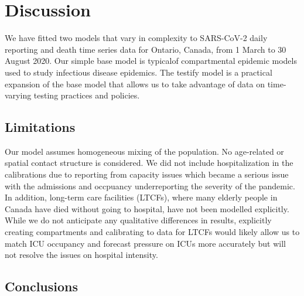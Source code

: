 \documentclass[12pt]{article}\usepackage[]{graphicx}\usepackage[]{color}
\begin{document}
\FloatBarrier

\section{Discussion}

We have fitted two models that vary in complexity to SARS-CoV-2 daily reporting and death time series data for Ontario, Canada, from 1 March to 30 August 2020.  Our simple base model is typicalof compartmental epidemic models used to study infectious disease epidemics.  The testify model   is a practical expansion of the base model that allows us to take advantage of data on time-varying testing practices and policies.

\subsection{Limitations}

Our model assumes homogeneous mixing of the population. 
No age-related or spatial contact structure is considered. 
We did not include hospitalization in the calibrations due to reporting from capacity issues which became a serious issue with the admissions and occpuancy underreporting the severity of the pandemic.
In addition, long-term care facilities (LTCFs), where many elderly people in Canada have died without going to hospital, have not been modelled explicitly.  
While we do not anticipate any qualitative differences in results, explicitly creating compartments and calibrating to data for LTCFs would likely allow us to match ICU occupancy and forecast
pressure on ICUs more accurately but will not resolve the issues on hospital intensity.

\subsection{Conclusions}

\end{document}
